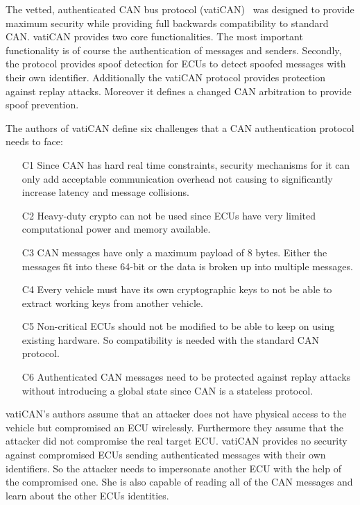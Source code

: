 The vetted, authenticated CAN bus protocol (vatiCAN)~\cite{Nurnberger2016} was
designed to provide maximum security while providing full backwards
compatibility to standard CAN\@. vatiCAN provides two core functionalities. The
most important functionality is of course the authentication of messages and
senders. Secondly, the protocol provides spoof detection for ECUs to detect
spoofed messages with their own identifier. Additionally the vatiCAN protocol
provides protection against replay attacks. Moreover it defines a changed CAN
arbitration to provide spoof prevention.

The authors of vatiCAN define six challenges that a CAN authentication protocol
needs to face:

\begin{enumerate}
    \item[C1] Since CAN has hard real time constraints, security mechanisms for
    it can only add acceptable communication overhead not causing to
    significantly increase latency and message collisions. 
    \item[C2] Heavy-duty crypto can not be used since ECUs have very limited
    computational power and memory available.
    \item[C3] CAN messages have only a maximum payload of 8 bytes. Either the
    messages fit into these 64-bit or the data is broken up into multiple
    messages.
    \item[C4] Every vehicle must have its own cryptographic keys to not be able
    to extract working keys from another vehicle.
    \item[C5] Non-critical ECUs should not be modified to be able to keep on
    using existing hardware. So compatibility is needed with the standard CAN
    protocol.
    \item[C6] Authenticated CAN messages need to be protected against replay
    attacks without introducing a global state since CAN is a stateless
    protocol.
\end{enumerate}

vatiCAN's authors assume that an attacker does not have physical access to the
vehicle but compromised an ECU wirelessly. Furthermore they assume that the
attacker did not compromise the real target ECU\@. vatiCAN provides no security
against compromised ECUs sending authenticated messages with their own
identifiers. So the attacker needs to impersonate another ECU with the help of
the compromised one. She is also capable of reading all of the CAN messages and
learn about the other ECUs identities.

